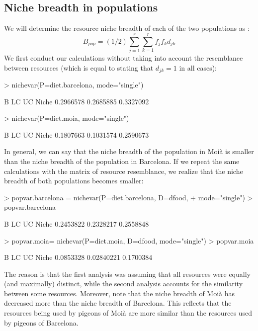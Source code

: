 \documentclass[11pt,a4paper]{article}
\begin{document}
\subsection{Niche breadth in populations}
We will determine the resource niche breadth of each of the two populations as \citep{DeCaceres2011}: 
\[
B_{pop} = (1/2)\sum_{j=1}^r\sum_{k=1}^r{f_jf_kd_{jk}}
\]
We first conduct our calculations without taking into account the resemblance between resources (which is equal to stating that $d_{jk}=1$ in all cases):
\begin{Schunk}
\begin{Sinput}
> nichevar(P=diet.barcelona, mode="single")
\end{Sinput}
\begin{Soutput}
              B        LC        UC
Niche 0.2966578 0.2685885 0.3327092
\end{Soutput}
\begin{Sinput}
> nichevar(P=diet.moia, mode="single")
\end{Sinput}
\begin{Soutput}
              B        LC        UC
Niche 0.1807663 0.1031574 0.2590673
\end{Soutput}
\end{Schunk}
In general, we can say that the niche breadth of the population in Moià is smaller than the niche breadth of the population in Barcelona. If we repeat the same calculations with the matrix of resource resemblance, we realize that the niche breadth of both populations becomes smaller:
\begin{Schunk}
\begin{Sinput}
> popvar.barcelona = nichevar(P=diet.barcelona, D=dfood, 
+                             mode="single")
> popvar.barcelona
\end{Sinput}
\begin{Soutput}
              B        LC        UC
Niche 0.2453822 0.2328217 0.2558848
\end{Soutput}
\begin{Sinput}
> popvar.moia= nichevar(P=diet.moia, D=dfood, mode="single")
> popvar.moia
\end{Sinput}
\begin{Soutput}
              B         LC        UC
Niche 0.0853328 0.02840221 0.1700384
\end{Soutput}
\end{Schunk}
The reason is that the first analysis was assuming that all resources were equally (and maximally) distinct, while the second analysis accounts for the similarity between some resources. Moreover, note that the niche breadth of Moià has decreased more than the niche breadth of Barcelona. This reflects that the resources being used by pigeons of Moià are more similar than the resources used by pigeons of Barcelona.
\end{document}
